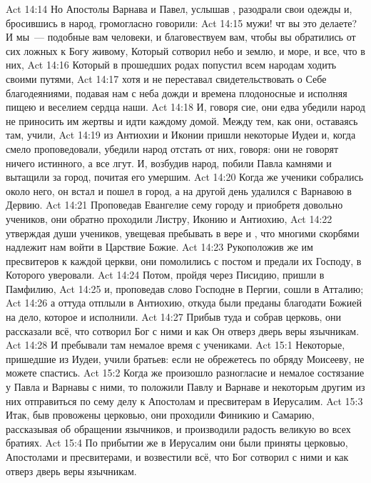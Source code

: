 \vs Act 14:14 Но Апостолы Варнава и Павел, услышав , разодрали свои одежды и, бросившись в народ, громогласно говорили:
\vs Act 14:15 мужи! чт вы это делаете? И мы~--- подобные вам человеки, и благовествуем вам, чтобы вы обратились от сих ложных к Богу живому, Который сотворил небо и землю, и море, и все, что в них,
\vs Act 14:16 Который в прошедших родах попустил всем народам ходить своими путями,
\vs Act 14:17 хотя и не переставал свидетельствовать о Себе благодеяниями, подавая нам с неба дожди и времена плодоносные и исполняя пищею и веселием сердца наши.
\vs Act 14:18 И, говоря сие, они едва убедили народ не приносить им жертвы и идти каждому домой. Между тем, как они, оставаясь там, учили,
\vs Act 14:19 из Антиохии и Иконии пришли некоторые Иудеи и, когда  смело проповедовали, убедили народ отстать от них, говоря: они не говорят ничего истинного, а все лгут. И, возбудив народ, побили Павла камнями и вытащили за город, почитая его умершим.
\vs Act 14:20 Когда же ученики собрались около него, он встал и пошел в город, а на другой день удалился с Варнавою в Дервию.
\rsbpar\vs Act 14:21 Проповедав Евангелие сему городу и приобретя довольно учеников, они обратно проходили Листру, Иконию и Антиохию,
\vs Act 14:22 утверждая души учеников, увещевая пребывать в вере и , что многими скорбями надлежит нам войти в Царствие Божие.
\vs Act 14:23 Рукоположив же им пресвитеров к каждой церкви, они помолились с постом и предали их Господу, в Которого уверовали.
\vs Act 14:24 Потом, пройдя через Писидию, пришли в Памфилию,
\vs Act 14:25 и, проповедав слово Господне в Пергии, сошли в Атталию;
\vs Act 14:26 а оттуда отплыли в Антиохию, откуда были преданы благодати Божией на дело, которое и исполнили.
\rsbpar\vs Act 14:27 Прибыв туда и собрав церковь, они рассказали всё, что сотворил Бог с ними и как Он отверз дверь веры язычникам.
\vs Act 14:28 И пребывали там немалое время с учениками.
\vs Act 15:1 Некоторые, пришедшие из Иудеи, учили братьев: если не обрежетесь по обряду Моисееву, не можете спастись.
\vs Act 15:2 Когда же произошло разногласие и немалое состязание у Павла и Варнавы с ними, то положили Павлу и Варнаве и некоторым другим из них отправиться по сему делу к Апостолам и пресвитерам в Иерусалим.
\vs Act 15:3 Итак, быв провожены церковью, они проходили Финикию и Самарию, рассказывая об обращении язычников, и производили радость великую во всех братиях.
\vs Act 15:4 По прибытии же в Иерусалим они были приняты церковью, Апостолами и пресвитерами, и возвестили всё, что Бог сотворил с ними и как отверз дверь веры язычникам.
